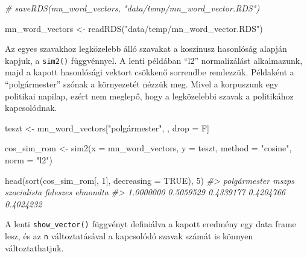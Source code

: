 \documentclass[
]{book}
\newenvironment{Shaded}{\begin{snugshade}}{\end{snugshade}}
\newcommand{\AttributeTok}[1]{\textcolor[rgb]{0.77,0.63,0.00}{#1}}
\newcommand{\CommentTok}[1]{\textcolor[rgb]{0.56,0.35,0.01}{\textit{#1}}}
\newcommand{\ConstantTok}[1]{\textcolor[rgb]{0.00,0.00,0.00}{#1}}
\newcommand{\DecValTok}[1]{\textcolor[rgb]{0.00,0.00,0.81}{#1}}
\newcommand{\FunctionTok}[1]{\textcolor[rgb]{0.00,0.00,0.00}{#1}}
\newcommand{\NormalTok}[1]{#1}
\newcommand{\OtherTok}[1]{\textcolor[rgb]{0.56,0.35,0.01}{#1}}
\newcommand{\StringTok}[1]{\textcolor[rgb]{0.31,0.60,0.02}{#1}}
\begin{document}
\begin{Shaded}
\begin{Highlighting}[]
\CommentTok{\# saveRDS(mn\_word\_vectors, "data/temp/mn\_word\_vector.RDS")}

\NormalTok{mn\_word\_vectors }\OtherTok{\textless{}{-}} \FunctionTok{readRDS}\NormalTok{(}\StringTok{"data/temp/mn\_word\_vector.RDS"}\NormalTok{)}
\end{Highlighting}
\end{Shaded}

Az egyes szavakhoz legközelebb álló szavakat a koszinusz hasonlóság
alapján kapjuk, a \texttt{sim2()} függvénnyel. A lenti példában ``l2''
normalizálást alkalmazunk, majd a kapott hasonlósági vektort csökkenő
sorrendbe rendezzük. Példaként a ``polgármester'' szónak a környezetét
nézzük meg. Mivel a korpuszunk egy politikai napilap, ezért nem meglepő,
hogy a legközelebbi szavak a politikához kapcsolódnak.

\begin{Shaded}
\begin{Highlighting}[]
\NormalTok{teszt }\OtherTok{\textless{}{-}}\NormalTok{ mn\_word\_vectors[}\StringTok{"polgármester"}\NormalTok{, , drop }\OtherTok{=}\NormalTok{ F]}

\NormalTok{cos\_sim\_rom }\OtherTok{\textless{}{-}} \FunctionTok{sim2}\NormalTok{(}\AttributeTok{x =}\NormalTok{ mn\_word\_vectors, }\AttributeTok{y =}\NormalTok{ teszt, }\AttributeTok{method =} \StringTok{"cosine"}\NormalTok{, }\AttributeTok{norm =} \StringTok{"l2"}\NormalTok{)}

\FunctionTok{head}\NormalTok{(}\FunctionTok{sort}\NormalTok{(cos\_sim\_rom[, }\DecValTok{1}\NormalTok{], }\AttributeTok{decreasing =} \ConstantTok{TRUE}\NormalTok{), }\DecValTok{5}\NormalTok{)}
\CommentTok{\#\textgreater{} polgármester        mszps  szocialista     fideszes     elmondta }
\CommentTok{\#\textgreater{}    1.0000000    0.5059529    0.4339177    0.4204766    0.4024232}
\end{Highlighting}
\end{Shaded}

A lenti \texttt{show\_vector()} függvényt definiálva a kapott eredmény
egy data frame lesz, és az \texttt{n} változtatásával a kapcsolódó
szavak számát is könnyen változtathatjuk.
\end{document}
